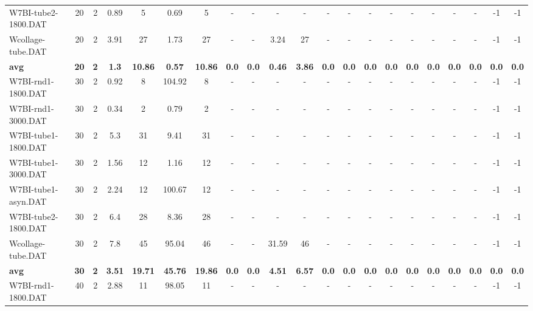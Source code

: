 \begin{sidewaystable}[!ht]
{\begin{tabular}{lcccccccccccccccccccc}
W7BI-tube2-1800.DAT & 20 & 2 & 0.89 & 5 &  \textcolor{blue2}{0.69} & 5 &  - &  - &  - &  - &  - &  - &  - &  - &  - &  - &  - &  - & -1 & -1 \\
Wcollage-tube.DAT & 20 & 2 & 3.91 & 27 &  \textcolor{blue2}{1.73} & 27 &  - &  - & 3.24 & 27 &  - &  - &  - &  - &  - &  - &  - &  - & -1 & -1 \\
\cline{1-21} \textbf{avg} & \textbf{20} & \textbf{2} & \textbf{1.3} & \textbf{10.86} & \textbf{0.57} & \textbf{10.86} & \textbf{0.0} & \textbf{0.0} & \textbf{0.46} & \textbf{3.86} & \textbf{0.0} & \textbf{0.0} & \textbf{0.0} & \textbf{0.0} & \textbf{0.0} & \textbf{0.0} & \textbf{0.0} & \textbf{0.0} & \textbf{0.0} & \textbf{0.0} \\ \cline{1-21}
W7BI-rnd1-1800.DAT & 30 & 2 &  \textcolor{blue2}{0.92} & 8 & 104.92 & 8 &  - &  - &  - &  - &  - &  - &  - &  - &  - &  - &  - &  - & -1 & -1 \\
W7BI-rnd1-3000.DAT & 30 & 2 &  \textcolor{blue2}{0.34} & 2 & 0.79 & 2 &  - &  - &  - &  - &  - &  - &  - &  - &  - &  - &  - &  - & -1 & -1 \\
W7BI-tube1-1800.DAT & 30 & 2 &  \textcolor{blue2}{5.3} & 31 & 9.41 & 31 &  - &  - &  - &  - &  - &  - &  - &  - &  - &  - &  - &  - & -1 & -1 \\
W7BI-tube1-3000.DAT & 30 & 2 & 1.56 & 12 &  \textcolor{blue2}{1.16} & 12 &  - &  - &  - &  - &  - &  - &  - &  - &  - &  - &  - &  - & -1 & -1 \\
W7BI-tube1-asyn.DAT & 30 & 2 &  \textcolor{blue2}{2.24} & 12 & 100.67 & 12 &  - &  - &  - &  - &  - &  - &  - &  - &  - &  - &  - &  - & -1 & -1 \\
W7BI-tube2-1800.DAT & 30 & 2 &  \textcolor{blue2}{6.4} & 28 & 8.36 & 28 &  - &  - &  - &  - &  - &  - &  - &  - &  - &  - &  - &  - & -1 & -1 \\
Wcollage-tube.DAT & 30 & 2 &  \textcolor{blue2}{7.8} & 45 & 95.04 & 46 &  - &  - & 31.59 & 46 &  - &  - &  - &  - &  - &  - &  - &  - & -1 & -1 \\
\cline{1-21} \textbf{avg} & \textbf{30} & \textbf{2} & \textbf{3.51} & \textbf{19.71} & \textbf{45.76} & \textbf{19.86} & \textbf{0.0} & \textbf{0.0} & \textbf{4.51} & \textbf{6.57} & \textbf{0.0} & \textbf{0.0} & \textbf{0.0} & \textbf{0.0} & \textbf{0.0} & \textbf{0.0} & \textbf{0.0} & \textbf{0.0} & \textbf{0.0} & \textbf{0.0} \\ \cline{1-21}
W7BI-rnd1-1800.DAT & 40 & 2 &  \textcolor{blue2}{2.88} & 11 & 98.05 & 11 &  - &  - &  - &  - &  - &  - &  - &  - &  - &  - &  - &  - & -1 & -1 \\

\end{tabular}}
\end{sidewaystable}
